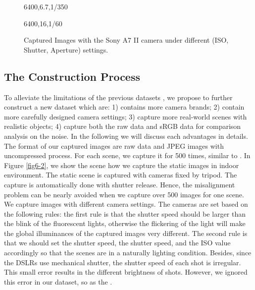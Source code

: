 \begin{figure}
{\begin{minipage}[t]{0.32\textwidth}
{\footnotesize 6400,6.7,1/350}
\end{minipage}
\begin{minipage}[t]{0.32\textwidth}
\centering
{}
{\footnotesize 6400,16,1/60}
\end{minipage}
}
    \caption{Captured Images with the Sony A7 II camera under different (ISO, Shutter, Aperture) settings.}
    \label{fig6-1}
\end{figure}


\subsection{The Construction Process}

To alleviate the limitations of the previous datasets \cite{RENOIR2014,crosschannel2016,dnd2017}, we propose to further construct a new dataset which are: 1) contains more camera brands; 2) contain more carefully designed camera settings; 3) capture more real-world scenes with realistic objects; 4) capture both the raw data and sRGB data for comparison analysis on the noise. In the following we will discuss each advantages in details. The format of our captured images are raw data and JPEG images with uncompressed process. For each scene, we capture it for 500 times, similar to \cite{crosschannel2016}. In Figure \ref{fig6-2}, we show the scene how we capture the static images in indoor environment. The static scene is captured with cameras fixed by tripod. The capture is automatically done with shutter release. Hence, the misalignment problem can be nearly avoided when we capture over 500 images for one scene. We capture images with different camera settings. The cameras are set based on the following rules: the first rule is that the shutter speed should be larger than the blink of the fluorescent lights, otherwise the flickering of the light will make the global illuminances of the captured images very different. The second rule is that we should set the shutter speed, the shutter speed, and the ISO value accordingly so that the scenes are in a naturally lighting condition. Besides, since the DSLRs use mechanical shutter, the shutter speed of each shot is irregular. This small error results in the different brightness of shots. However, we ignored this error in our dataset, so as the \cite{crosschannel2016}.

